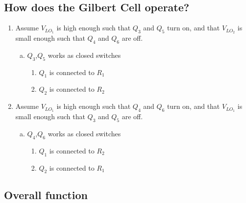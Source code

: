 \subsection{How does the Gilbert Cell operate?}
\begin{enumerate}
  \item Assume $V_{LO_1}$ is high enough such
    that $Q_3$ and $Q_5$ turn on, and that
  $V_{LO_2}$ is small enough such that 
  $Q_4$ and $Q_6$ are off.
  \begin{enumerate}[(a)]
    \item $Q_3$,$Q_5$ works as closed switches
      \begin{enumerate}[i]
      \item \(Q_1\) is connected to $R_1$
      \item \(Q_2\) is connected to $R_2$
    \end{enumerate}
  \end{enumerate}
  \item Assume $V_{LO_1}$ is high enough such
    that $Q_4$ and $Q_6$ turn on, and that
  $V_{LO_1}$ is small enough such that 
  $Q_3$ and $Q_5$ are off.
  \begin{enumerate}[(a)]
    \item $Q_4$,$Q_6$ works as closed switches
      \begin{enumerate}[i]
      \item $Q_1$ is connected to $R_2$
      \item $Q_2$ is connected to $R_1$
    \end{enumerate}
  \end{enumerate}
\end{enumerate}

\subsection{Overall function}

